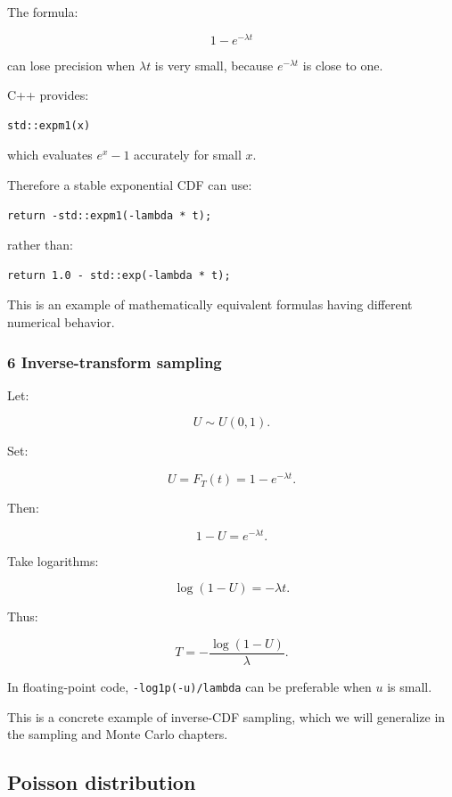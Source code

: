The formula:

\[
 1-e^{-\lambda t}
\]

can lose precision when \(\lambda t\) is very small, because \(e^{-\lambda t}\) is close to one.

C++ provides:

\begin{verbatim}
std::expm1(x)
\end{verbatim}

which evaluates \(e^x-1\) accurately for small \(x\).

Therefore a stable exponential CDF can use:

\begin{verbatim}
return -std::expm1(-lambda * t);
\end{verbatim}

rather than:

\begin{verbatim}
return 1.0 - std::exp(-lambda * t);
\end{verbatim}

This is an example of mathematically equivalent formulas having different numerical behavior.

\subsubsection{6 Inverse-transform sampling}\label{02-foundations-ii-ch024-inverse-transform-sampling}

Let:

\[
 U\sim U(0,1).
\]

Set:

\[
 U=F_T(t)=1-e^{-\lambda t}.
\]

Then:

\[
 1-U=e^{-\lambda t}.
\]

Take logarithms:

\[
 \log(1-U)=-\lambda t.
\]

Thus:

\[
 \boxed{ T=-\frac{\log(1-U)}{\lambda} }.
\]

In floating-point code, \texttt{-log1p(-u)/lambda} can be preferable when \(u\) is small.

This is a concrete example of inverse-CDF sampling, which we will generalize in the sampling and Monte Carlo chapters.

\subsection{Poisson distribution}\label{02-foundations-ii-ch024-poisson-distribution}

